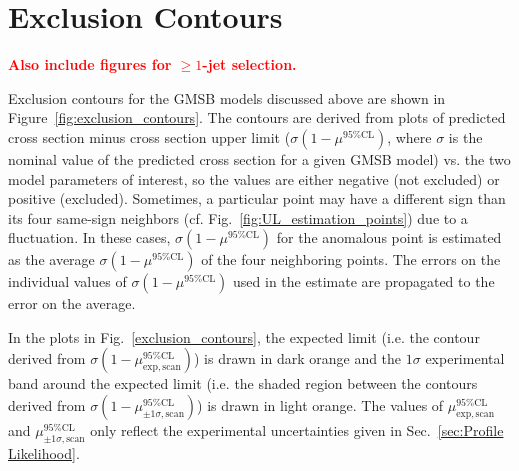 \documentclass[dissertation.tex]{subfiles}
\begin{document}
\section{Exclusion Contours}
\label{sec:Exclusion Contours}

\textcolor{red}{\textbf{Also include figures for $\geq1$-jet selection.}}

Exclusion contours for the GMSB models discussed above are shown in Figure~\ref{fig:exclusion_contours}.  The contours are derived from plots of predicted cross section minus cross section upper limit ($\sigma(1 - \mu^{95\%\mathrm{CL}})$, where $\sigma$ is the nominal value of the predicted cross section for a given GMSB model) vs. the two model parameters of interest, so the values are either negative (not excluded) or positive (excluded).  Sometimes, a particular point may have a different sign than its four same-sign neighbors (cf. Fig.~\ref{fig:UL_estimation_points}) due to a fluctuation.  In these cases, $\sigma(1 - \mu^{95\%\mathrm{CL}})$ for the anomalous point is estimated as the average $\sigma(1 - \mu^{95\%\mathrm{CL}})$ of the four neighboring points.  The errors on the individual values of $\sigma(1 - \mu^{95\%\mathrm{CL}})$ used in the estimate are propagated to the error on the average.


In the plots in Fig.~\ref{exclusion_contours}, the expected limit (i.e. the contour derived from $\sigma(1 - \mu_{\mathrm{exp,scan}}^{95\%\mathrm{CL}})$) is drawn in dark orange and the $1\sigma$ experimental band around the expected limit (i.e. the shaded region between the contours derived from $\sigma(1 - \mu^{95\%\mathrm{CL}}_{\pm1\sigma\mathrm{,scan}})$) is drawn in light orange.  The values of $\mu_{\mathrm{exp,scan}}^{95\%\mathrm{CL}}$ and $\mu^{95\%\mathrm{CL}}_{\pm1\sigma\mathrm{,scan}}$ only reflect the experimental uncertainties given in Sec.~\ref{sec:Profile Likelihood}.
\end{document}
